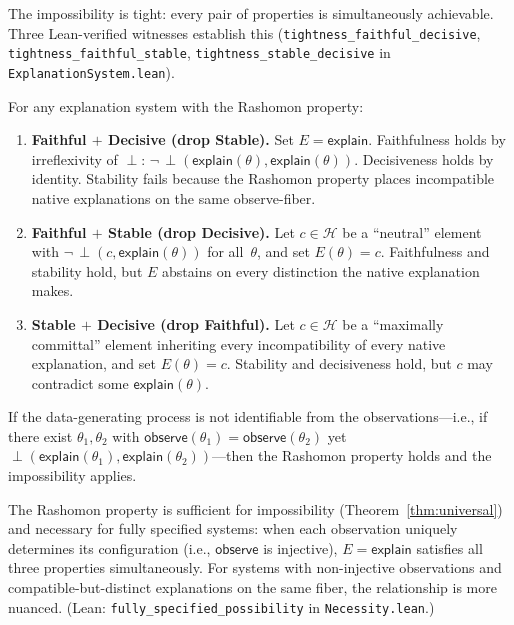 \documentclass[twoside]{jmlr}
\newcommand{\sH}{\mathcal{H}}
\newcommand{\incomp}{\perp}                  %
\begin{document}
The impossibility is tight: every pair of properties is simultaneously
achievable.  Three Lean-verified witnesses establish this
(\texttt{tightness\_faithful\_decisive},
\texttt{tightness\_faithful\_stable},
\texttt{tightness\_stable\_decisive} in \texttt{ExplanationSystem.lean}).

\begin{proposition}
\label{prop:tightness}
For any explanation system with the Rashomon property:
\begin{enumerate}
  \item \textbf{Faithful $+$ Decisive (drop Stable).}
    Set $E = \mathsf{explain}$.  Faithfulness holds by irreflexivity of
    $\incomp$: $\neg\,\incomp(\mathsf{explain}(\theta), \mathsf{explain}(\theta))$.
    Decisiveness holds by identity.  Stability fails because the Rashomon
    property places incompatible native explanations on the same observe-fiber.

  \item \textbf{Faithful $+$ Stable (drop Decisive).}
    Let $c \in \sH$ be a ``neutral'' element with
    $\neg\,\incomp(c, \mathsf{explain}(\theta))$ for all~$\theta$, and set
    $E(\theta) = c$.  Faithfulness and stability hold, but $E$ abstains on
    every distinction the native explanation makes.

  \item \textbf{Stable $+$ Decisive (drop Faithful).}
    Let $c \in \sH$ be a ``maximally committal'' element inheriting every
    incompatibility of every native explanation, and set $E(\theta) = c$.
    Stability and decisiveness hold, but $c$ may contradict some
    $\mathsf{explain}(\theta)$.
\end{enumerate}
\end{proposition}

\begin{corollary}
\label{cor:decidable}
If the data-generating process is not identifiable from the
observations---i.e., if there exist $\theta_1, \theta_2$ with
$\mathsf{observe}(\theta_1) = \mathsf{observe}(\theta_2)$ yet
$\incomp(\mathsf{explain}(\theta_1), \mathsf{explain}(\theta_2))$---then
the Rashomon property holds and the impossibility applies.
\end{corollary}

\begin{proposition}
\label{prop:necessity}
The Rashomon property is sufficient for impossibility (Theorem~\ref{thm:universal})
and necessary for fully specified systems: when each observation uniquely determines
its configuration (i.e., $\mathsf{observe}$ is injective), $E = \mathsf{explain}$
satisfies all three properties simultaneously.  For systems with non-injective
observations and compatible-but-distinct explanations on the same fiber,
the relationship is more nuanced.
(Lean: \texttt{fully\_specified\_possibility} in \texttt{Necessity.lean}.)
\end{proposition}
\end{document}
